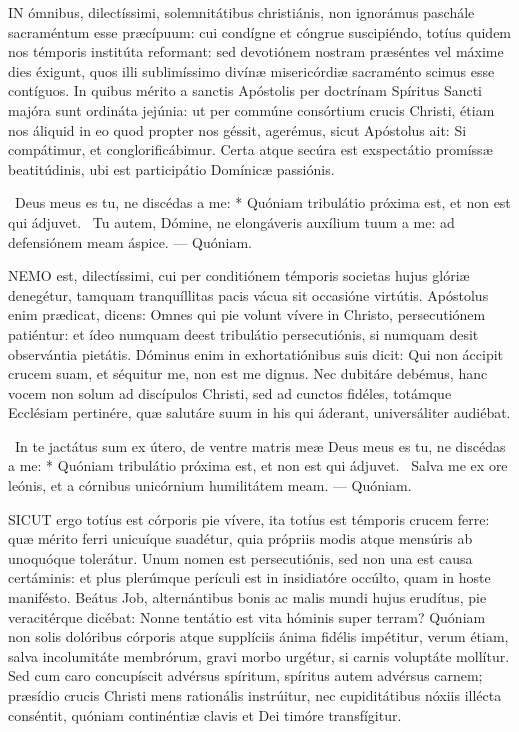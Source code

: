 



\lettrine[lines=2]{I}{N} ómnibus, dilectíssimi, solemnitátibus christiánis, non ignorámus paschále sacraméntum esse præcípuum: cui condígne et cóngrue suscipiéndo, totíus quidem nos témporis institúta reformant: sed devotiónem nostram præséntes vel máxime dies éxigunt, quos illi sublimíssimo divínæ misericórdiæ sacraménto scimus esse contíguos. In quibus mérito a sanctis Apóstolis per doctrínam Spíritus Sancti majóra sunt ordináta jejúnia: ut per commúne consórtium crucis Christi, étiam nos áliquid in eo quod propter nos géssit, agerémus, sicut Apóstolus ait: Si compátimur, et conglorificábimur. Certa atque secúra est exspectátio promíssæ beatitúdinis, ubi est participátio Domínicæ passiónis.

\R\ Deus meus es tu, ne discédas a me: * Quóniam tribulátio próxima est, et non est qui ádjuvet. \V\ Tu autem, Dómine, ne elongáveris auxílium tuum a me: ad defensiónem meam áspice. --- Quóniam.


\lettrine[lines=2]{N}{EMO} est, dilectíssimi, cui per conditiónem témporis societas hujus glóriæ denegétur, tamquam tranquíllitas pacis vácua sit occasióne virtútis. Apóstolus enim prædicat, dicens: Omnes qui pie volunt vívere in Christo, persecutiónem patiéntur: et ídeo numquam deest tribulátio persecutiónis, si numquam desit observántia pietátis. Dóminus enim in exhortatiónibus suis dicit: Qui non áccipit crucem suam, et séquitur me, non est me dignus. Nec dubitáre debémus, hanc vocem non solum ad discípulos Christi, sed ad cunctos fidéles, totámque Ecclésiam pertinére, quæ salutáre suum in his qui áderant, universáliter audiébat.

\R\ In te jactátus sum ex útero, de ventre matris meæ Deus meus es tu, ne discédas a me: * Quóniam tribulátio próxima est, et non est qui ádjuvet. \V\ Salva me ex ore leónis, et a córnibus unicórnium humilitátem meam. --- Quóniam.


\lettrine[lines=2]{S}{ICUT} ergo totíus est córporis pie vívere, ita totíus est témporis crucem ferre: quæ mérito ferri unicuíque suadétur, quia própriis modis atque mensúris ab unoquóque tolerátur. Unum nomen est persecutiónis, sed non una est causa certáminis: et plus plerúmque perículi est in insidiatóre occúlto, quam in hoste manifésto. Beátus Job, alternántibus bonis ac malis mundi hujus erudítus, pie veracitérque dicébat: Nonne tentátio est vita hóminis super terram? Quóniam non solis dolóribus córporis atque supplíciis ánima fidélis impétitur, verum étiam, salva incolumitáte membrórum, gravi morbo urgétur, si carnis voluptáte mollítur. Sed cum caro concupíscit advérsus spíritum, spíritus autem advérsus carnem; præsídio crucis Christi mens rationális instrúitur, nec cupiditátibus nóxiis illécta conséntit, quóniam continéntiæ clavis et Dei timóre transfígitur.

